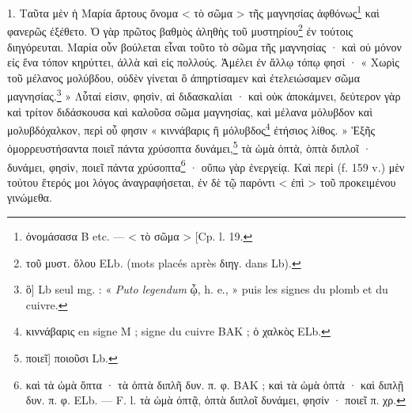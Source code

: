 \documentclass[landscape, a4paper, 11pt, oneside, polutonikogreek, french]{article}
\begin{document}
\bigskip

1. Ταῦτα μὲν ἡ Μαρία ἄρτους ὄνομα < τὸ σῶμα > τῆς μαγνησίας ἀφθόνως\footnote{ὀνομάσασα B etc. --- < τὸ σῶμα > [Cp. l. 19.} καὶ φανερῶς ἐξέθετο. Ὁ γὰρ πρῶτος βαθμὸς ἀληθὴς τοῦ μυστηρίου\footnote{τοῦ μυστ. ὅλου ELb. (mots placés après διηγ. dans Lb).} ἐν τούτοις διηγόρευται. Μαρία οὖν βούλεται εἶναι τοῦτο τὸ σῶμα τῆς μαγνησίας · καὶ οὐ μόνον εἰς ἕνα τόπον κηρύττει, ἀλλὰ καὶ εἰς πολλούς. Ἀμέλει ἐν ἄλλῳ τόπῳ φησί · « Χωρὶς τοῦ μέλανος μολύβδου, οὐδὲν γίνεται ὃ ἀπηρτίσαμεν καὶ ἐτελειώσαμεν σῶμα μαγνησίας.\footnote{ὃ] Lb seul mg. : « \emph{Puto legendum} ᾧ, h. e., » puis les signes du plomb et du cuivre.} » Λὗταί εἰσιν, φησὶν, αἱ διδασκαλίαι · καὶ οὐκ ἀποκάμνει, δεύτερον γὰρ καὶ τρίτον διδάσκουσα καὶ καλοῦσα σῶμα μαγνησίας, καὶ μέλανα μόλυβδον καὶ μολυβδόχαλκον, περὶ οὗ φησιν « κιννάβαρις ἢ μόλυβδος\footnote{κιννάβαρις en signe M ; signe du cuivre BAK ; ὁ χαλκὸς ELb.} ἐτήσιος λίθος. » Ἑξῆς ὀμορρευστήσαντα ποιεῖ πάντα χρύσοπτα δυνάμει,\footnote{ποιεῖ] ποιοῦσι Lb.} τὰ ὠμὰ ὀπτὰ, ὀπτὰ διπλοῖ · δυνάμει, φησὶν, ποιεῖ πάντα χρύσοπτα\footnote{καὶ τὰ ὠμὰ ὄπτα · τὰ ὀπτὰ διπλῆ δυν. π. φ. BAK ; καὶ τὰ ὠμὰ ὀπτὰ · καὶ διπλῇ δυν. π. φ. ELb. --- F. l. τὰ ὠμὰ όπτᾷ, ὀπτὰ διπλοῖ δυνάμει, φησίν · ποιεῖ π. χρ.} · οὔπω γὰρ ἐνεργείᾳ. Καὶ περὶ (f. 159 v.) μὲν τούτου ἕτερός μοι λόγος ἀναγραφήσεται, ἐν δὲ τῷ παρόντι < ἐπὶ > τοῦ προκειμένου γινώμεθα.
\end{document}
